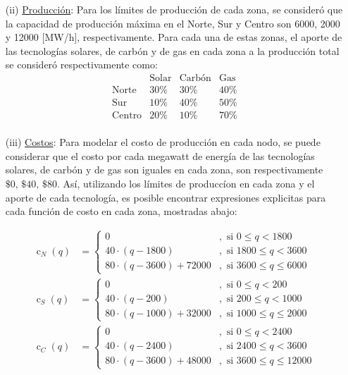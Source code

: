 \documentclass[12pt,twoside]{article}
\begin{document}
\begin{itemize}
		\item [(ii)] \underline{Producci\'on}: Para los l\'imites de producci\'on de cada zona, se consider\'o que la capacidad de producci\'on m\'axima en el Norte, Sur y Centro son 6000, 2000 y 12000 [MW/h], respectivamente. Para cada una de estas zonas, el aporte de las tecnolog\'ias solares, de carb\'on y de gas en cada zona a la producci\'on total se consider\'o respectivamente como:
		\begin{equation*}\begin{array}{c|c|c|c}
			& \text{Solar} & \text{Carb\'on} & \text{Gas} \\ \hline
			\text{Norte} & 30\% & 30\% & 40\% \\
			\text{Sur} & 10\% & 40\% & 50\% \\
			\text{Centro} & 20\% & 10\% & 70\% \\
		\end{array}\end{equation*}
		
		\item [(iii)] \underline{Costos}: Para modelar el costo de producci\'on en cada nodo, se puede considerar que el costo por cada megawatt de energ\'ia de las tecnolog\'ias solares, de carb\'on y de gas son iguales en cada zona, son respectivamente \(\$0,\,\$40,\,\$80\). As\'i, utilizando los l\'imites de producc\'ion en cada zona y el aporte de cada tecnolog\'ia, es posible encontrar expresiones explicitas para cada funci\'on de costo en cada zona, mostradas abajo: 
		
		\begin{equation*}\begin{aligned}
			\operatorname{c}_N(q)&=\left\{\begin{array}{cl}
					0 & ,\text{ si } 0\leq q<1800 \\
					40\cdot(q-1800) & ,\text{ si } 1800\leq q<3600 \\
					80\cdot(q-3600)+72000 & ,\text{ si } 3600\leq q\leq6000
				\end{array}\right. \\
			\operatorname{c}_S(q)&=\left\{\begin{array}{cl}
					0 & ,\text{ si } 0\leq q<200 \\
					40\cdot(q-200) & ,\text{ si } 200\leq q<1000 \\
					80\cdot(q-1000)+32000 & ,\text{ si } 1000\leq q\leq2000
				\end{array}\right. \\
			\operatorname{c}_C(q)&=\left\{\begin{array}{cl}
					0 & ,\text{ si } 0\leq q<2400 \\
					40\cdot(q-2400) & ,\text{ si } 2400\leq q<3600 \\
					80\cdot(q-3600)+48000 & ,\text{ si } 3600\leq q\leq12000
				\end{array}\right.
		\end{aligned}\end{equation*}
		 

\end{itemize}
\end{document}
